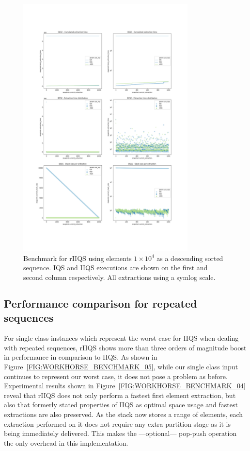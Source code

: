 \begin{figure}[!ht]
    \centering
    \includegraphics[width=0.8\textwidth]{./fragments/05_workhorse_experiment/images/01_basebenchmark_03_sort_d_case.png}
    \caption{Benchmark for rIIQS using elements $1\times10^4$ as a descending sorted sequence. IQS and IIQS executions are shown on the first and second column respectively. All extractions using a symlog scale.}
    \label{FIG:WORKHORSE_BENCHMARK_03}
\end{figure}

\FloatBarrier
\subsection{Performance comparison for repeated sequences}

For single class instances which represent the worst case for IIQS when dealing with repeated sequences, rIIQS shows more than three orders of magnitude boost in performance in comparison to IIQS. As shown in Figure~\ref{FIG:WORKHORSE_BENCHMARK_05}, while our single class input continues to represent our worst case, it does not pose a problem as before. Experimental results shown in Figure~\ref{FIG:WORKHORSE_BENCHMARK_04} reveal that rIIQS does not only perform a fastest first element extraction, but also that formerly stated properties of IIQS as optimal space usage and fastest extractions are also preserved. As the stack now stores a range of elements, each extraction performed on it does not require any extra partition stage as it is being immediately delivered. This makes the ---optional--- pop-push operation the only overhead in this implementation.


